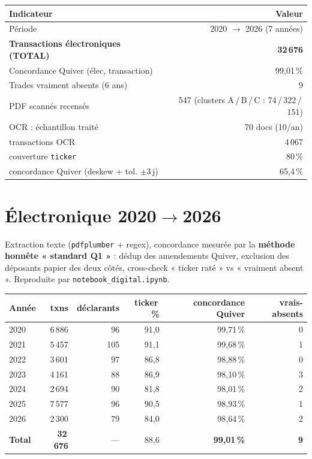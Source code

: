 \documentclass[11pt,a4paper]{article}
\newcommand{\file}[1]{\texttt{\small #1}}
\begin{document}
\begin{center}
\begin{tabular}{@{}l r@{}}
\toprule
\textbf{Indicateur} & \textbf{Valeur} \\
\midrule
Période & 2020 $\rightarrow$ 2026 (7 années) \\
\textbf{Transactions électroniques (TOTAL)} & \textbf{32\,676} \\
Concordance Quiver (élec, transaction) & 99,01\,\% \\
Trades vraiment absents (6 ans) & 9 \\
\midrule
PDF scannés recensés & 547 \quad(clusters A\,/\,B\,/\,C : 74\,/\,322\,/\,151) \\
OCR : échantillon traité & 70 docs (10/an) \\
\quad transactions OCR & 4\,067 \\
\quad couverture \texttt{ticker} & 80\,\% \\
\quad concordance Quiver (deskew + tol. $\pm$3\,j) & 65,4\,\% \\
\bottomrule
\end{tabular}
\end{center}

\section{Électronique 2020$\rightarrow$2026}

Extraction texte (\texttt{pdfplumber} + regex), concordance mesurée par la
\textbf{méthode honnête « standard Q1 »} : dédup des amendements Quiver, exclusion
des déposants papier des deux côtés, cross-check « ticker raté » vs « vraiment absent ».
Reproduite par \file{notebook\_digital.ipynb}.

\begin{center}
\begin{tabular}{@{}l r r r r r@{}}
\toprule
\textbf{Année} & \textbf{txns} & \textbf{déclarants} & \textbf{ticker\,\%}
  & \textbf{concordance Quiver} & \textbf{vrais-absents} \\
\midrule
2020 & 6\,886 & 96  & 91,0 & 99,71\,\% & 0 \\
2021 & 5\,457 & 105 & 91,1 & 99,68\,\% & 1 \\
2022 & 3\,601 & 97  & 86,8 & 98,88\,\% & 0 \\
2023 & 4\,161 & 88  & 86,9 & 98,10\,\% & 3 \\
2024 & 2\,694 & 90  & 81,8 & 98,01\,\% & 2 \\
2025 & 7\,577 & 96  & 90,5 & 98,93\,\% & 1 \\
2026 & 2\,300 & 79  & 84,0 & 98,64\,\% & 2 \\
\midrule
\textbf{Total} & \textbf{32\,676} & --- & 88,6 & \textbf{99,01\,\%} & \textbf{9} \\
\bottomrule
\end{tabular}
\end{center}
\end{document}
